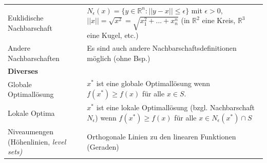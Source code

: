 \begin{tabularx}{\textwidth}{p{7cm} X}
  \hline
    Euklidische Nachbarschaft
      & $N_\epsilon(x) = \{ y \in \mathbb{R}^n: ||y-x|| \leq \epsilon \}$ mit $\epsilon > 0$, $||x|| = \sqrt{x^2} = \sqrt{x_1^2 + ... + x_n^n}$ (in $\mathbb{R}^2$ eine Kreis, $\mathbb{R}^3$ eine Kugel, etc.)\\
    Andere Nachbarschaften
      & Es sind auch andere Nachbarschaftsdefinitionen möglich (ohne Bsp.)\\
  \hline
    \textbf{Diverses} &\\
  \hline
      Globale Optimallösung
      & $x^*$ ist eine globale Optimallösung wenn $f(x^*) \geq f(x)$ für alle $x \in S$.\\
    Lokale Optima
      & $x^*$ ist eine lokale Optimallösung (bzgl. Nachbarschaft $N_\epsilon$) wenn $f(x^*) \geq f(x)$ für alle $x \in N_\epsilon(x^*) \cap S$\\
    Niveaumengen (Höhenlinien, \em level sets\em)
      & Orthogonale Linien zu den linearen Funktionen (Geraden)\\      
  \end{tabularx}
  

